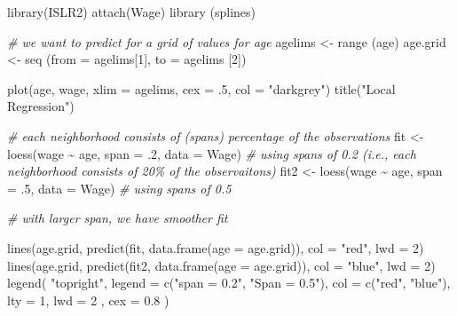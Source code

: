 \documentclass[
]{book}
\newenvironment{Shaded}{\begin{snugshade}}{\end{snugshade}}
\newcommand{\AttributeTok}[1]{\textcolor[rgb]{0.77,0.63,0.00}{#1}}
\newcommand{\CommentTok}[1]{\textcolor[rgb]{0.56,0.35,0.01}{\textit{#1}}}
\newcommand{\DecValTok}[1]{\textcolor[rgb]{0.00,0.00,0.81}{#1}}
\newcommand{\FloatTok}[1]{\textcolor[rgb]{0.00,0.00,0.81}{#1}}
\newcommand{\FunctionTok}[1]{\textcolor[rgb]{0.00,0.00,0.00}{#1}}
\newcommand{\NormalTok}[1]{#1}
\newcommand{\OtherTok}[1]{\textcolor[rgb]{0.56,0.35,0.01}{#1}}
\newcommand{\SpecialCharTok}[1]{\textcolor[rgb]{0.00,0.00,0.00}{#1}}
\newcommand{\StringTok}[1]{\textcolor[rgb]{0.31,0.60,0.02}{#1}}
\begin{document}
\begin{Shaded}
\begin{Highlighting}[]
\FunctionTok{library}\NormalTok{(ISLR2)}
\FunctionTok{attach}\NormalTok{(Wage)}
\FunctionTok{library}\NormalTok{ (splines)}

\CommentTok{\# we want to predict for a grid of values for age}
\NormalTok{agelims }\OtherTok{\textless{}{-}} \FunctionTok{range}\NormalTok{ (age)}
\NormalTok{age.grid }\OtherTok{\textless{}{-}} \FunctionTok{seq}\NormalTok{ (}\AttributeTok{from =}\NormalTok{ agelims[}\DecValTok{1}\NormalTok{], }\AttributeTok{to =}\NormalTok{ agelims [}\DecValTok{2}\NormalTok{])}



\FunctionTok{plot}\NormalTok{(age,}
\NormalTok{     wage,}
     \AttributeTok{xlim =}\NormalTok{ agelims,}
     \AttributeTok{cex =}\NormalTok{ .}\DecValTok{5}\NormalTok{,}
     \AttributeTok{col =} \StringTok{"darkgrey"}\NormalTok{)}
\FunctionTok{title}\NormalTok{(}\StringTok{"Local Regression"}\NormalTok{)}

\CommentTok{\# each neighborhood consists of (spans) percentage of the observations}
\NormalTok{fit }\OtherTok{\textless{}{-}} \FunctionTok{loess}\NormalTok{(wage }\SpecialCharTok{\textasciitilde{}}\NormalTok{ age, }\AttributeTok{span =}\NormalTok{ .}\DecValTok{2}\NormalTok{, }\AttributeTok{data =}\NormalTok{ Wage) }\CommentTok{\# using spans of 0.2 (i.e., each neighborhood consists of 20\% of the observaitons)}
\NormalTok{fit2 }\OtherTok{\textless{}{-}} \FunctionTok{loess}\NormalTok{(wage }\SpecialCharTok{\textasciitilde{}}\NormalTok{ age, }\AttributeTok{span =}\NormalTok{ .}\DecValTok{5}\NormalTok{, }\AttributeTok{data =}\NormalTok{ Wage) }\CommentTok{\# using spans of 0.5}

\CommentTok{\# with larger span, we have smoother fit }


\FunctionTok{lines}\NormalTok{(age.grid,}
      \FunctionTok{predict}\NormalTok{(fit, }\FunctionTok{data.frame}\NormalTok{(}\AttributeTok{age =}\NormalTok{ age.grid)),}
      \AttributeTok{col =} \StringTok{"red"}\NormalTok{,}
      \AttributeTok{lwd =} \DecValTok{2}\NormalTok{)}
\FunctionTok{lines}\NormalTok{(age.grid,}
      \FunctionTok{predict}\NormalTok{(fit2, }\FunctionTok{data.frame}\NormalTok{(}\AttributeTok{age =}\NormalTok{ age.grid)),}
      \AttributeTok{col =} \StringTok{"blue"}\NormalTok{,}
      \AttributeTok{lwd =} \DecValTok{2}\NormalTok{)}
\FunctionTok{legend}\NormalTok{(}
    \StringTok{"topright"}\NormalTok{,}
    \AttributeTok{legend =} \FunctionTok{c}\NormalTok{(}\StringTok{"span = 0.2"}\NormalTok{, }\StringTok{"Span = 0.5"}\NormalTok{),}
    \AttributeTok{col =} \FunctionTok{c}\NormalTok{(}\StringTok{"red"}\NormalTok{, }\StringTok{"blue"}\NormalTok{),}
    \AttributeTok{lty =} \DecValTok{1}\NormalTok{,}
    \AttributeTok{lwd =} \DecValTok{2}\NormalTok{ ,}
    \AttributeTok{cex =} \FloatTok{0.8}
\NormalTok{)}
\end{Highlighting}
\end{Shaded}
\end{document}
